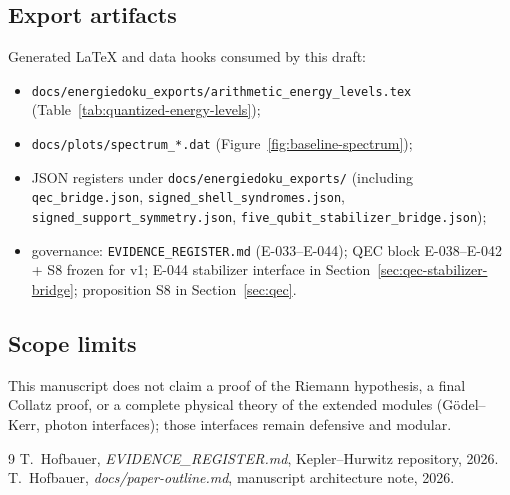 \documentclass[11pt, lettersize, article]{article}
\theoremstyle{definition}
\theoremstyle{remark}
\begin{document}
\subsection{Export artifacts}

Generated LaTeX and data hooks consumed by this draft:
\begin{itemize}
  \item \texttt{docs/energiedoku\_exports/arithmetic\_energy\_levels.tex} (Table~\ref{tab:quantized-energy-levels});
  \item \texttt{docs/plots/spectrum\_*.dat} (Figure~\ref{fig:baseline-spectrum});
  \item JSON registers under \texttt{docs/energiedoku\_exports/} (including \texttt{qec\_bridge.json}, \texttt{signed\_shell\_syndromes.json}, \texttt{signed\_support\_symmetry.json}, \texttt{five\_qubit\_stabilizer\_bridge.json});
  \item governance: \texttt{EVIDENCE\_REGISTER.md} (E-033--E-044); QEC block E-038--E-042 + S8 frozen for v1; E-044 stabilizer interface in Section~\ref{sec:qec-stabilizer-bridge}; proposition S8 in Section~\ref{sec:qec}.
\end{itemize}

\subsection{Scope limits}

This manuscript does not claim a proof of the Riemann hypothesis, a final Collatz proof, or a complete physical theory of the extended modules (G\"odel--Kerr, photon interfaces); those interfaces remain defensive and modular.


\begin{thebibliography}{9}
T.~Hofbauer, \emph{EVIDENCE\_REGISTER.md}, Kepler--Hurwitz repository, 2026.
T.~Hofbauer, \emph{docs/paper-outline.md}, manuscript architecture note, 2026.
\end{thebibliography}
\end{document}
